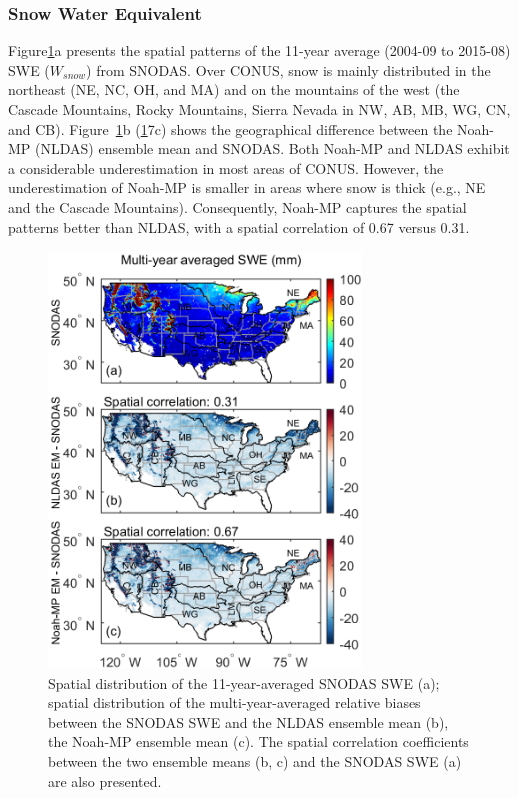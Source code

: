 \documentclass[essd, manuscript]{copernicus}
\begin{document}
\subsubsection{Snow Water Equivalent}\label{sec:results:swe}

Figure\ref{fig:swe:clim}a presents the spatial patterns of the 11-year average (2004-09 to 2015-08) SWE (\(W_{snow}\)) from SNODAS. Over CONUS, snow is mainly distributed in the northeast (NE, NC, OH, and MA) and on the mountains of the west (the Cascade Mountains, Rocky Mountains, Sierra Nevada in NW, AB, MB, WG, CN, and CB). Figure~\ref{fig:swe:clim}b (\ref{fig:swe:clim}7c) shows the geographical difference between the Noah-MP (NLDAS) ensemble mean and SNODAS. Both Noah-MP and NLDAS exhibit a considerable underestimation in most areas of CONUS. However, the underestimation of Noah-MP is smaller in areas where snow is thick (e.g., NE and the Cascade Mountains). Consequently, Noah-MP captures the spatial patterns better than NLDAS, with a spatial correlation of 0.67 versus 0.31.

\begin{figure}[t]
  \includegraphics[width=8.3cm]{fig/fig07.pdf}
  \caption{Spatial distribution of the 11-year-averaged SNODAS SWE (a); spatial distribution of the multi-year-averaged relative biases between the SNODAS SWE and the NLDAS ensemble mean (b), the Noah-MP ensemble mean (c). The spatial correlation coefficients between the two ensemble means (b, c) and the SNODAS SWE (a) are also presented.}
  \label{fig:swe:clim}
\end{figure}
\end{document}
